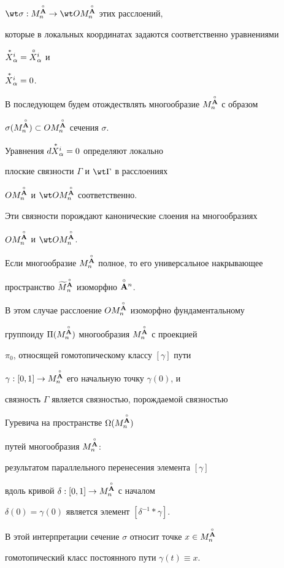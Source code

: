 $\wt\sigma: M^{\Ao}_n\to \wt OM^{\Ao}_n$ этих расслоений,


которые в локальных координатах задаются соответственно уравнениями


${\overset{\,\ast}{X}{}}{}_\alpha^i={\overset{\,\circ}{X}{}}{}_\alpha^i$ и


${\overset{\,\ast}{X}{}}{}_\alpha^i=0$.


В последующем будем отождествлять многообразие $M^{\overset{\circ}{\bold A}{}}_n$ с образом


$\sigma(M^{\overset{\circ}{\bold A}{}}_n)\subset OM^{\overset{\circ}{\bold A}{}}_n$ сечения $\sigma$.





Уравнения $d{\overset{\,\ast}{X}{}}{}_\alpha^i=0$ определяют локально


плоские связности $\Gamma$ и $\wt\Gamma$ в расслоениях


$OM^{\overset{\circ}{\bold A}{}}_n$ и $\wt OM^{\Ao}_n$ соответственно.


Эти связности порождают канонические слоения на многообразиях


$OM^{\overset{\circ}{\bold A}{}}_n$ и $\wt OM^{\Ao}_n$.


Если многообразие $M^{\overset{\circ}{\bold A}{}}_n$ полное, то его универсальное накрывающее


пространство ${\widetilde M}{}^{\overset{\circ}{\bold A}{}}_n$ изоморфно $\overset{\circ}{\bold A}{}^n$.


В этом случае расслоение $OM^{\overset{\circ}{\bold A}{}}_n$ изоморфно фундаментальному


группоиду $\Pi(M^{\overset{\circ}{\bold A}{}}_n)$ многообразия $M^{\overset{\circ}{\bold A}{}}_n$ с проекцией


$\pi_0$, относящей гомотопическому классу $[\gamma]$ пути


$\gamma : [0,1] \to M^{\overset{\circ}{\bold A}{}}_n$ его начальную точку $\gamma(0)$, и


связность $\Gamma$ является связностью, порождаемой связностью


Гуревича \cite{Post2} на пространстве $\Omega(M^{\overset{\circ}{\bold A}{}}_n)$


путей многообразия $M^{\overset{\circ}{\bold A}{}}_n$:


результатом параллельного перенесения элемента $[\gamma]$


вдоль кривой $\delta : [0,1] \to M^{\overset{\circ}{\bold A}{}}_n$ с началом


$\delta(0)=\gamma(0)$ является элемент $[\delta^{-1}*\gamma]$.


В этой интерпретации сечение $\sigma$ относит точке $x \in M^{\overset{\circ}{\bold A}{}}_n$


гомотопический класс постоянного пути $\gamma (t)\equiv x$.





